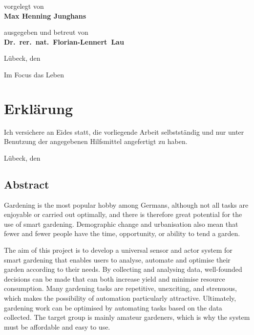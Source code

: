 \begin{titlepage}
{	\titlepageskip
	vorgelegt von\\
	\textbf{Max Henning Junghans}

	\titlepageskip
	ausgegeben und betreut von\\
	\textbf{Dr.~rer.~nat.~Florian-Lennert~Lau}

	\vfill
	{
		Lübeck, den \abgabedatum
	}

	{
		\titlepageskip
		Im Focus das Leben
	}
}
\end{titlepage}
\restoregeometry

\cleardoublepage

\newpage
\chapter*{Erklärung}

Ich versichere an Eides statt, die vorliegende Arbeit selbstständig und nur unter Benutzung
der angegebenen Hilfsmittel angefertigt zu haben.

\vspace*{3cm}
Lübeck, den \abgabedatum

\thispagestyle{empty}
\cleardoublepage




\section*{\huge Abstract}
Gardening is the most popular hobby among Germans, although not all tasks are enjoyable or carried out optimally, and there is therefore great potential for the use of smart gardening.
Demographic change and urbanisation also mean that fewer and fewer people have the time, opportunity, or ability to tend a garden.

The aim of this project is to develop a universal sensor and actor system for smart gardening that enables users to analyse, automate and optimise their garden according to their needs.
By collecting and analysing data, well-founded decisions can be made that can both increase yield and minimise resource consumption.
Many gardening tasks are repetitive, unexciting, and strenuous, which makes the possibility of automation particularly attractive.
Ultimately, gardening work can be optimised by automating tasks based on the data collected.
The target group is mainly amateur gardeners, which is why the system must be affordable and easy to use.


